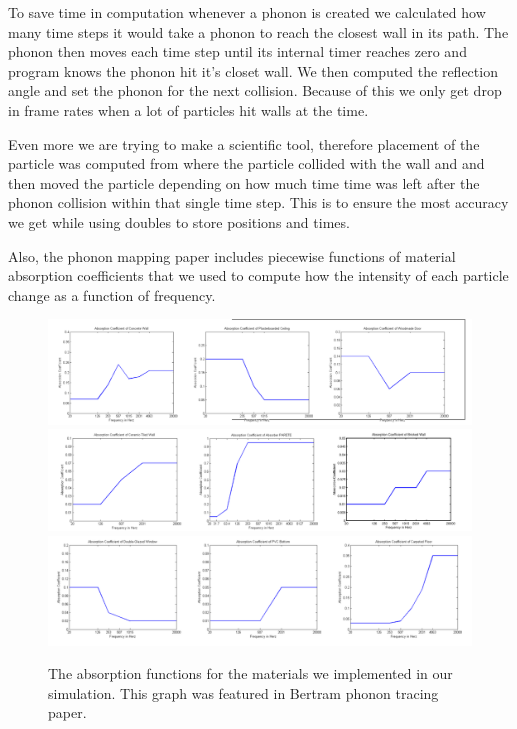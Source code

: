 \documentclass{thesis}
\begin{document}
To save time in computation whenever a phonon is created we calculated how many time steps it would take a phonon to reach the closest wall in its path. The phonon then moves each time step until its internal timer reaches zero and program knows the phonon hit it's closet wall. We then computed the reflection angle and set the phonon for the next collision. Because of this we only get drop in frame rates when a lot of particles hit walls at the time. 

Even more we are trying to make a scientific tool, therefore placement of the particle was computed from where the particle collided with the wall and  and then moved the particle depending on how much time time was left after the phonon collision within that single time step. This is to ensure the most accuracy we get while using doubles to store positions and times.  

Also, the phonon mapping paper includes piecewise functions of material absorption coefficients that we used to compute how the intensity of each particle change as a function of frequency.
\begin{figure}
        \centering
        \includegraphics[width=5in]{images/chart_1}
        \includegraphics[width=5in]{images/chart_2}
        \includegraphics[width=5in]{images/chart_3}
        \caption{The absorption functions for the materials we implemented in our simulation. This graph was featured in Bertram phonon tracing paper.\cite{bertram}}
    \end{figure}
    
\end{document}

